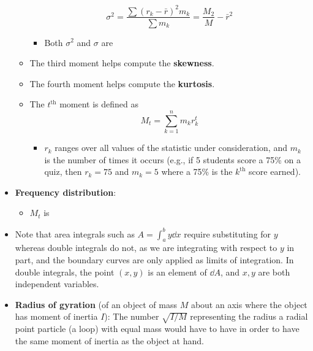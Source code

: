 \documentclass[../main.tex]{subfiles}
\begin{document}
\begin{itemize}
\begin{itemize}
\begin{equation*}
            \sigma^2 = \frac{\sum(r_k-\bar{r})^2m_k}{\sum m_k} = \frac{M_2}{M}-\bar{r}^2
        \end{equation*}
        \begin{itemize}
            \item Both $\sigma^2$ and $\sigma$ are 
        \end{itemize}
        \item The third moment helps compute the \textbf{skewness}.
        \item The fourth moment helps compute the \textbf{kurtosis}.
        \item The $t^\text{th}$ moment is defined as
        \begin{equation*}
            M_t = \sum_{k=1}^nm_kr_k^t
        \end{equation*}
        \begin{itemize}
            \item $r_k$ ranges over all values of the statistic under consideration, and $m_k$ is the number of times it occurs (e.g., if 5 students score a 75\% on a quiz, then $r_k=75$ and $m_k=5$ where a 75\% is the $k^\text{th}$ score earned).
        \end{itemize}
    \end{itemize}
    \item \textbf{Frequency distribution}: 
    \begin{itemize}
        \item $M_t$ is 
    \end{itemize}
    \item Note that area integrals such as $A=\int_a^by\dd{x}$ require substituting for $y$ whereas double integrals do not, as we are integrating with respect to $y$ in part, and the boundary curves are only applied as limits of integration. In double integrals, the point $(x,y)$ is an element of $\dd{A}$, and $x,y$ are both independent variables.
    \item \textbf{Radius of gyration} (of an object of mass $M$ about an axis where the object has moment of inertia $I$): The number $\sqrt{I/M}$ representing the radius a radial point particle (a loop) with equal mass would have to have in order to have the same moment of inertia as the object at hand.
\end{itemize}
\end{document}
